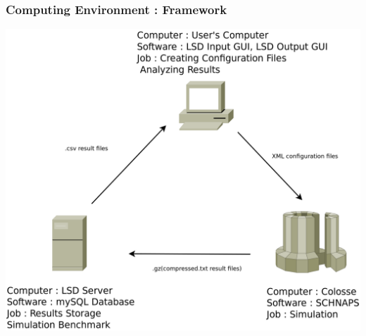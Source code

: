 \documentclass[notes, handout]{beamer}
\begin{document}
\begin{frame}
	\frametitle{Computing Environment : Framework}
	\begin{center}
	\includegraphics[scale=0.18]{Diagram1}
	\end{center}
\end{frame}
\end{document}
